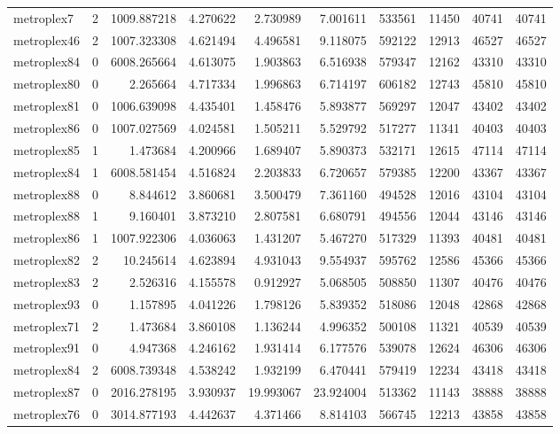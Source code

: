 \begin{longtable}{|l|r|r|r|r|r|r|r|r|r|}
metroplex7 & 2 & 1009.887218 & 4.270622 & 2.730989 & 7.001611 & 533561 & 11450 & 40741 & 40741 \\
metroplex46 & 2 & 1007.323308 & 4.621494 & 4.496581 & 9.118075 & 592122 & 12913 & 46527 & 46527 \\
metroplex84 & 0 & 6008.265664 & 4.613075 & 1.903863 & 6.516938 & 579347 & 12162 & 43310 & 43310 \\
metroplex80 & 0 & 2.265664 & 4.717334 & 1.996863 & 6.714197 & 606182 & 12743 & 45810 & 45810 \\
metroplex81 & 0 & 1006.639098 & 4.435401 & 1.458476 & 5.893877 & 569297 & 12047 & 43402 & 43402 \\
metroplex86 & 0 & 1007.027569 & 4.024581 & 1.505211 & 5.529792 & 517277 & 11341 & 40403 & 40403 \\
metroplex85 & 1 & 1.473684 & 4.200966 & 1.689407 & 5.890373 & 532171 & 12615 & 47114 & 47114 \\
metroplex84 & 1 & 6008.581454 & 4.516824 & 2.203833 & 6.720657 & 579385 & 12200 & 43367 & 43367 \\
metroplex88 & 0 & 8.844612 & 3.860681 & 3.500479 & 7.361160 & 494528 & 12016 & 43104 & 43104 \\
metroplex88 & 1 & 9.160401 & 3.873210 & 2.807581 & 6.680791 & 494556 & 12044 & 43146 & 43146 \\
metroplex86 & 1 & 1007.922306 & 4.036063 & 1.431207 & 5.467270 & 517329 & 11393 & 40481 & 40481 \\
metroplex82 & 2 & 10.245614 & 4.623894 & 4.931043 & 9.554937 & 595762 & 12586 & 45366 & 45366 \\
metroplex83 & 2 & 2.526316 & 4.155578 & 0.912927 & 5.068505 & 508850 & 11307 & 40476 & 40476 \\
metroplex93 & 0 & 1.157895 & 4.041226 & 1.798126 & 5.839352 & 518086 & 12048 & 42868 & 42868 \\
metroplex71 & 2 & 1.473684 & 3.860108 & 1.136244 & 4.996352 & 500108 & 11321 & 40539 & 40539 \\
metroplex91 & 0 & 4.947368 & 4.246162 & 1.931414 & 6.177576 & 539078 & 12624 & 46306 & 46306 \\
metroplex84 & 2 & 6008.739348 & 4.538242 & 1.932199 & 6.470441 & 579419 & 12234 & 43418 & 43418 \\
metroplex87 & 0 & 2016.278195 & 3.930937 & 19.993067 & 23.924004 & 513362 & 11143 & 38888 & 38888 \\
metroplex76 & 0 & 3014.877193 & 4.442637 & 4.371466 & 8.814103 & 566745 & 12213 & 43858 & 43858 \\

\end{longtable}
